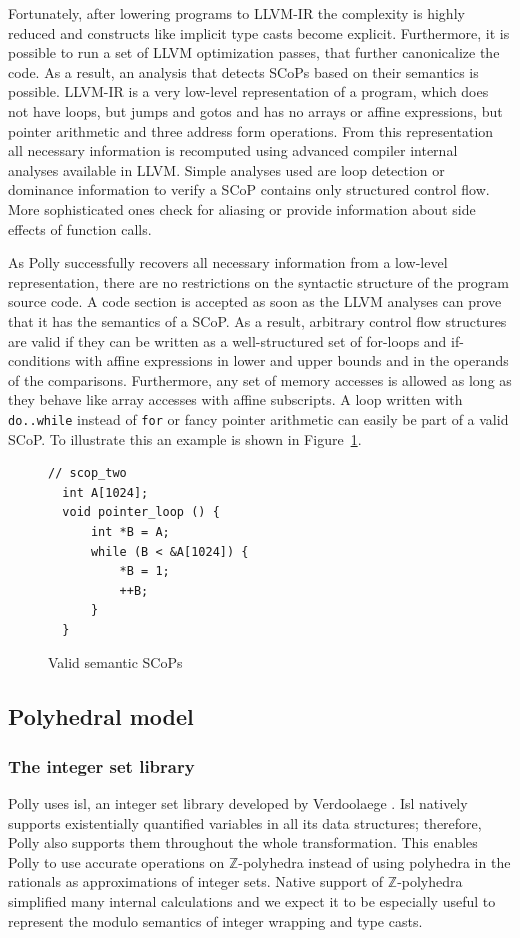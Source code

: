 Fortunately, after lowering programs to LLVM-IR the complexity is highly
reduced and constructs like implicit type casts become explicit. Furthermore,
it is possible to run a set of LLVM optimization passes, that further
canonicalize the code.  As a result, an
analysis that detects SCoPs based on their semantics is possible.  LLVM-IR is a
very low-level representation of a program, which does not have loops, but
jumps and gotos and has no arrays or affine expressions, but pointer arithmetic
and three address form operations. From this representation all necessary
information is recomputed using advanced compiler internal analyses available
in LLVM. Simple analyses used are loop detection or dominance information to
verify a SCoP contains only structured control flow. More sophisticated ones
check for aliasing or provide information about side effects of
function calls. 

As Polly successfully recovers all necessary information from a low-level
representation, there are no restrictions on the syntactic structure of the
program source code. A code section is accepted as soon as the LLVM analyses
can prove that it has the semantics of a SCoP. As a result, 
arbitrary control
flow structures are valid if they can be written as a well-structured set
of for-loops and if-conditions with affine expressions in lower and upper
bounds and in the operands of the comparisons. Furthermore, any set of
memory accesses is allowed as long as they behave like array accesses with affine subscripts.
A loop written
with \texttt{do..while} instead of \texttt{for} or fancy pointer arithmetic can easily be part of a valid SCoP.
To illustrate this an example is shown in Figure~\ref{semscop}.

\begin{figure}
\begin{verbatim}
// scop_two
  int A[1024];
  void pointer_loop () {
      int *B = A;
      while (B < &A[1024]) {
          *B = 1;
          ++B;
      }
  }
\end{verbatim}
\caption{Valid semantic SCoPs}
\label{semscop}
\end{figure}

\subsection{Polyhedral model}

\subsubsection{The integer set library} Polly uses isl, an integer set library
developed by Verdoolaege \cite{Verdoolaege10}. Isl natively supports
existentially quantified variables in all its data structures; therefore, Polly
also supports them throughout the whole transformation. This enables Polly to
use accurate operations on $\mathbb{Z}$-polyhedra instead of using polyhedra
in the rationals as approximations of integer sets.
Native support of $\mathbb{Z}$-polyhedra
simplified many internal calculations and we
expect it to be especially useful to represent the modulo semantics of integer
wrapping and type casts.


